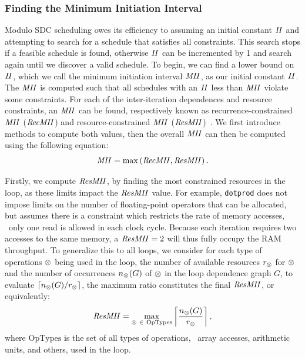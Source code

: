 \subsubsection{Finding the Minimum Initiation Interval}

Modulo SDC scheduling owes its efficiency to assuming an initial constant
$\mathit{II}$ and attempting to search for a schedule that satisfies all constraints.
This search stops if a feasible schedule is found, otherwise $\mathit{II}$ can be
incremented by 1 and search again until we discover a valid schedule.  To
begin, we can find a lower bound on $\mathit{II}$, which we call the minimum initiation
interval $\mathit{MII}$, as our initial constant $\mathit{II}$.  The $\mathit{MII}$ is computed such
that all schedules with an $\mathit{II}$ less than $\mathit{MII}$ violate some constraints.
For each of the inter-iteration dependences and resource constraints, an $\mathit{MII}$
can be found, respectively known as recurrence-constrained $\mathit{MII}$ ($\mathit{RecMII}$)
and resource-constrained $\mathit{MII}$ ($\mathit{ResMII}$)~\cite{rau94, canis14, zhang13}.  We
first introduce methods to compute both values, then the overall $\mathit{MII}$ can
then be computed using the following equation:
\begin{equation}
    \mathit{MII} = \max\left(\mathit{RecMII}, \mathit{ResMII}\right).
\end{equation}

Firstly, we compute $\mathit{ResMII}$, by finding the most constrained resources in the
loop, as these limits impact the $\mathit{ResMII}$ value.  For example, \verb|dotprod|
does not impose limits on the number of floating-point operators that can be
allocated, but assumes there is a constraint which restricts the rate of memory
accesses, \ie~only one read is allowed in each clock cycle.  Because each
iteration requires two accesses to the same memory, a $\mathit{ResMII} = 2$ will thus
fully occupy the RAM throughput.  To generalize this to all loops, we consider
for each type of operations $\otimes$ being used in the loop, the number of
available resources $r_\otimes$ for $\otimes$ and the number of occurrences
$n_\otimes(G)$ of $\otimes$ in the loop dependence graph $G$, to evaluate
$\left\lceil n_\otimes(G) / r_\otimes \right\rceil$, the maximum ratio
constitutes the final $\mathit{ResMII}$, or equivalently:
\begin{equation}
    \mathit{ResMII} = \max_{\otimes~\in~\mathrm{OpTypes}}
        \left\lceil
            \frac{n_\otimes(G)}{r_\otimes}
        \right\rceil,
\end{equation}
where $\mathrm{OpTypes}$ is the set of all types of operations, \eg~array
accesses, arithmetic units, and others, used in the loop.

